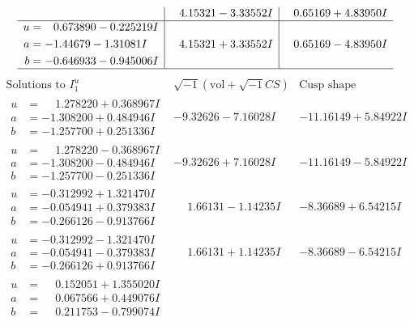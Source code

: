 \documentclass[1p]{elsarticle_modified}
\theoremstyle{definition}
\newcommand{\I}{\sqrt{-1}}
\begin{document}
$$\begin{array}{c|c|c}
 & \phantom{-}4.15321 - 3.33552 I & \phantom{-}0.65169 + 4.83950 I \\ \hline\begin{aligned}
u &= \phantom{-}0.673890 - 0.225219 I \\
a &= -1.44679 - 1.31081 I \\
b &= -0.646933 - 0.945006 I\end{aligned}
 & \phantom{-}4.15321 + 3.33552 I & \phantom{-}0.65169 - 4.83950 I\\
 \hline 
 \end{array}$$\newpage$$\begin{array}{c|c|c}  
\text{Solutions to }I^u_{1}& \I (\text{vol} + \sqrt{-1}CS) & \text{Cusp shape}\\
 \hline 
\begin{aligned}
u &= \phantom{-}1.278220 + 0.368967 I \\
a &= -1.308200 + 0.484946 I \\
b &= -1.257700 + 0.251336 I\end{aligned}
 & -9.32626 - 7.16028 I & -11.16149 + 5.84922 I \\ \hline\begin{aligned}
u &= \phantom{-}1.278220 - 0.368967 I \\
a &= -1.308200 - 0.484946 I \\
b &= -1.257700 - 0.251336 I\end{aligned}
 & -9.32626 + 7.16028 I & -11.16149 - 5.84922 I \\ \hline\begin{aligned}
u &= -0.312992 + 1.321470 I \\
a &= -0.054941 + 0.379383 I \\
b &= -0.266126 - 0.913766 I\end{aligned}
 & \phantom{-}1.66131 - 1.14235 I & -8.36689 + 6.54215 I \\ \hline\begin{aligned}
u &= -0.312992 - 1.321470 I \\
a &= -0.054941 - 0.379383 I \\
b &= -0.266126 + 0.913766 I\end{aligned}
 & \phantom{-}1.66131 + 1.14235 I & -8.36689 - 6.54215 I \\ \hline\begin{aligned}
u &= \phantom{-}0.152051 + 1.355020 I \\
a &= \phantom{-}0.067566 + 0.449076 I \\
b &= \phantom{-}0.211753 - 0.799074 I\end{aligned}

\end{array}$$
\end{document}
